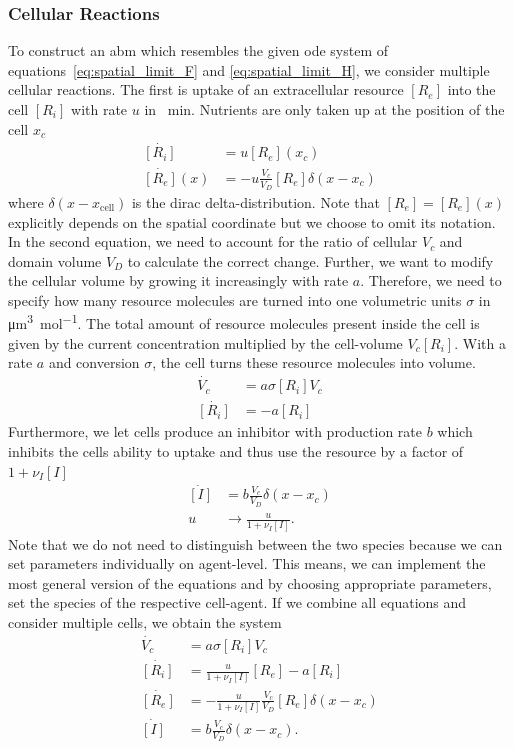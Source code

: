 \documentclass[10pt,A4paper]{article}
\numberwithin{equation}{section}
\begin{document}
\subsubsection{Cellular Reactions}
To construct an \ac{abm} which resembles the given \ac{ode} system of equations~\eqref{eq:spatial_limit_F} and \eqref{eq:spatial_limit_H}, we consider multiple cellular reactions.
The first is uptake of an extracellular resource $[R_e]$ into the cell $[R_i]$ with rate $u$ in \unit{\per\minute}.
Nutrients are only taken up at the position of the cell $x_c$
\begin{align}
    \dot{[R_i]} &= u [R_e](x_c)\\
    \dot{[R_e]}(x) &= -u \frac{V_c}{V_D} [R_e] \delta(x-x_c)
\end{align}
where $\delta(x-x_\text{cell})$ is the dirac delta-distribution.
Note that $[R_e]=[R_e](x)$ explicitly depends on the spatial coordinate but we choose to omit its notation.
In the second equation, we need to account for the ratio of cellular $V_c$ and domain volume $V_D$ to calculate the correct change.
Further, we want to modify the cellular volume by growing it increasingly with rate $a$.
Therefore, we need to specify how many resource molecules are turned into one volumetric units $\sigma$ in \unit{\micro\metre\cubed\per\mole}.
The total amount of resource molecules present inside the cell is given by the current concentration multiplied by the cell-volume $V_c [R_i]$.
With a rate $a$ and conversion $\sigma$, the cell turns these resource molecules into volume.
\begin{align}
    \dot{V_c} &= a\sigma [R_i] V_c\\
    \dot{[R_i]} &= - a[R_i]
\end{align}
Furthermore, we let cells produce an inhibitor with production rate $b$ which inhibits the cells ability to uptake and thus use the resource by a factor of $1+\nu_I [I]$
\begin{align}
    \dot{[I]} &= b\frac{V_c}{V_D}\delta(x-x_c)\\
    u &\longrightarrow \frac{u}{1+\nu_I [I]}.
\end{align}
Note that we do not need to distinguish between the two species because we can set parameters individually on agent-level.
This means, we can implement the most general version of the equations and by choosing appropriate parameters, set the species of the respective cell-agent.
If we combine all equations and consider multiple cells, we obtain the system
\begin{align}
    \dot{V_c} &= a\sigma [R_i] V_c\\
    \dot{[R_i]} &= \frac{u}{1+\nu_I [I]} [R_e] - a[R_i]\\
    \dot{[R_e]} &= -\frac{u}{1+\nu_I [I]} \frac{V_c}{V_D} [R_e] \delta(x-x_c)\\
    \dot{[I]} &= b\frac{V_c}{V_D}\delta(x-x_c).
    \label{eq:spatial-full-system-non-simplified}
\end{align}
\end{document}
